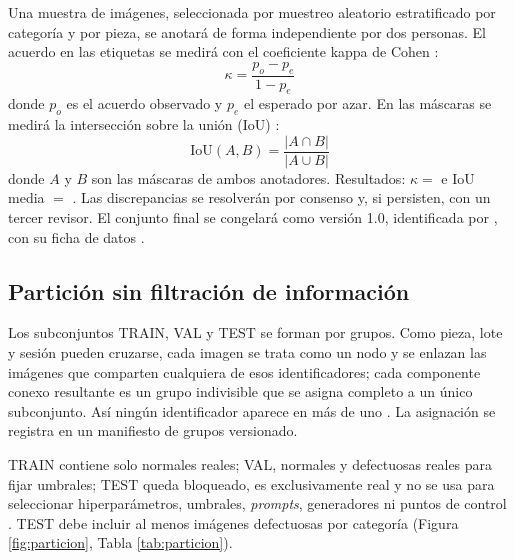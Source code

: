 \documentclass[12pt,oneside]{report}
\begin{document}
Una muestra de  imágenes, seleccionada por muestreo aleatorio estratificado por categoría y por pieza, se anotará de forma independiente por dos personas. El acuerdo en las etiquetas se medirá con el coeficiente kappa de Cohen \cite{cohen1960}:
\begin{equation}
  \kappa = \frac{p_o - p_e}{1 - p_e}
\end{equation}
donde $p_o$ es el acuerdo observado y $p_e$ el esperado por azar. En las máscaras se medirá la intersección sobre la unión (IoU) \cite{everingham2010}:
\begin{equation}
  \mathrm{IoU}(A,B) = \frac{|A \cap B|}{|A \cup B|}
\end{equation}
donde $A$ y $B$ son las máscaras de ambos anotadores. Resultados: $\kappa =$  e IoU media $=$ . Las discrepancias se resolverán por consenso y, si persisten, con un tercer revisor. El conjunto final se congelará como versión 1.0, identificada por , con su ficha de datos \cite{gebru2021}.

\subsection{Partición sin filtración de información}
\label{sec:particion}

Los subconjuntos TRAIN, VAL y TEST se forman por grupos. Como pieza, lote y sesión pueden cruzarse, cada imagen se trata como un nodo y se enlazan las imágenes que comparten cualquiera de esos identificadores; cada componente conexo resultante es un grupo indivisible que se asigna completo a un único subconjunto. Así ningún identificador aparece en más de uno \cite{kapoor2023}. La asignación se registra en un manifiesto de grupos versionado.

TRAIN contiene solo normales reales; VAL, normales y defectuosas reales para fijar umbrales; TEST queda bloqueado, es exclusivamente real y no se usa para seleccionar hiperparámetros, umbrales, \textit{prompts}, generadores ni puntos de control \cite{paez2026}. TEST debe incluir al menos  imágenes defectuosas por categoría (Figura \ref{fig:particion}, Tabla \ref{tab:particion}).
\end{document}
